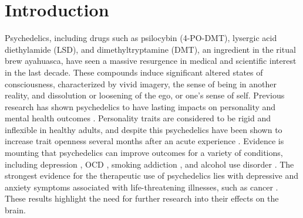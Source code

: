 
\chapter{Introduction}
    Psychedelics, including drugs such as psilocybin (4-PO-DMT), lysergic
acid diethylamide (LSD), and dimethyltryptamine (DMT), an ingredient in
the ritual brew ayahuasca, have seen a massive resurgence in medical and
scientific interest in the last decade. These compounds induce
significant altered states of consciousness, characterized by vivid
imagery, the sense of being in another reality, and dissolution or
loosening of the ego, or one's sense of self. Previous research has
shown psychedelics to have lasting impacts on personality and mental
health outcomes \parencite{Barbosa2009,Griffiths2008}.
Personality traits are considered to be rigid and inflexible in healthy
adults, and despite this psychedelics have been shown to increase trait
openness several months after an acute experience \parencite{Griffiths2011,MacLean2011, McCrae1997}. Evidence is
mounting that psychedelics can improve outcomes for a variety of
conditions, including depression \parencite{Raison2023}, OCD \parencite{Moreno2006}, smoking addiction \parencite{Johnson2017}, and alcohol
use disorder \parencite{Bogenschutz2015}. The strongest evidence for the
therapeutic use of psychedelics lies with depressive and anxiety
symptoms associated with life-threatening illnesses, such as cancer \parencite{Griffiths2008,Griffiths2006,Grob2011}.
These results highlight the need for further research into their effects
on the brain.

